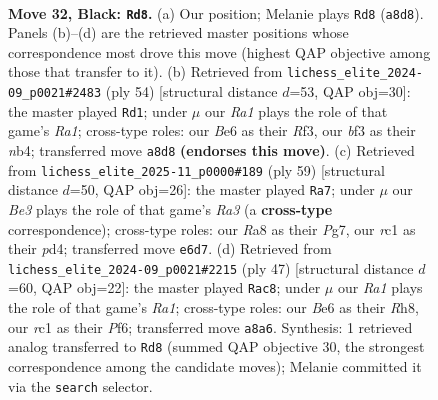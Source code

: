 \documentclass[11pt]{article}
\begin{document}
\clearpage

\begin{figure}[p]\centering
\begin{subfigure}{0.46\textwidth}\centering
\resizebox{\linewidth}{!}{%
\newchessgame
\chessboard[
  setfen={r4k1r/1p3p1p/4b1p1/p2p4/5P2/3K1B2/PP4PP/2R3RN b - - 6 32},
  showmover=false,
  pgfstyle=straightmove, color=movearrow, markmove={a8-d8}
]}
\caption{}
\end{subfigure}\hfill
\begin{subfigure}{0.46\textwidth}\centering
\resizebox{\linewidth}{!}{%
\newchessgame
\chessboard[
  setfen={2rr2k1/1p4pp/8/pP6/Pn1p1P2/3P1R2/1B4PP/R5K1 w - - 2 28},
  showmover=false,
  pgfstyle=straightmove, color=movearrow, markmove={a1-d1}
]}
\caption{}
\end{subfigure}
\\[4pt]
\begin{subfigure}{0.46\textwidth}\centering
\resizebox{\linewidth}{!}{%
\newchessgame
\chessboard[
  setfen={2r3k1/5pp1/r1p1b3/7p/p2PB3/Bp4PP/7K/3RR3 b - - 1 30},
  showmover=false,
  pgfstyle=straightmove, color=movearrow, markmove={a6-a7}
]}
\caption{}
\end{subfigure}\hfill
\begin{subfigure}{0.46\textwidth}\centering
\resizebox{\linewidth}{!}{%
\newchessgame
\chessboard[
  setfen={r6r/1p2k1p1/2b2p2/p1N1p3/8/4KPPp/PPPR3P/3R4 b - - 0 24},
  showmover=false,
  pgfstyle=straightmove, color=movearrow, markmove={a8-c8}
]}
\caption{}
\end{subfigure}
\caption{\textbf{Move 32, Black: \texttt{Rd8}.} (a) Our position; Melanie plays \texttt{Rd8} (\texttt{a8d8}). Panels (b)--(d) are the retrieved master positions whose correspondence most drove this move (highest QAP objective among those that transfer to it). (b) Retrieved from \texttt{lichess\_elite\_2024-09\_p0021\#2483} (ply 54) [structural distance $d$=53, QAP obj=30]: the master played \texttt{Rd1}; under $\mu$ our \emph{Ra1} plays the role of that game's \emph{Ra1}; cross-type roles: our \emph{B}e6 as their \emph{R}f3, our \emph{b}f3 as their \emph{n}b4; transferred move \texttt{a8d8} \textbf{(endorses this move)}. (c) Retrieved from \texttt{lichess\_elite\_2025-11\_p0000\#189} (ply 59) [structural distance $d$=50, QAP obj=26]: the master played \texttt{Ra7}; under $\mu$ our \emph{Be3} plays the role of that game's \emph{Ra3} (a \textbf{cross-type} correspondence); cross-type roles: our \emph{R}a8 as their \emph{P}g7, our \emph{r}c1 as their \emph{p}d4; transferred move \texttt{e6d7}. (d) Retrieved from \texttt{lichess\_elite\_2024-09\_p0021\#2215} (ply 47) [structural distance $d$=60, QAP obj=22]: the master played \texttt{Rac8}; under $\mu$ our \emph{Ra1} plays the role of that game's \emph{Ra1}; cross-type roles: our \emph{B}e6 as their \emph{R}h8, our \emph{r}c1 as their \emph{P}f6; transferred move \texttt{a8a6}. Synthesis: 1 retrieved analog transferred to \texttt{Rd8} (summed QAP objective 30, the strongest correspondence among the candidate moves); Melanie committed it via the \texttt{search} selector.}
\label{fig:thought-m63}
\end{figure}
\end{document}
